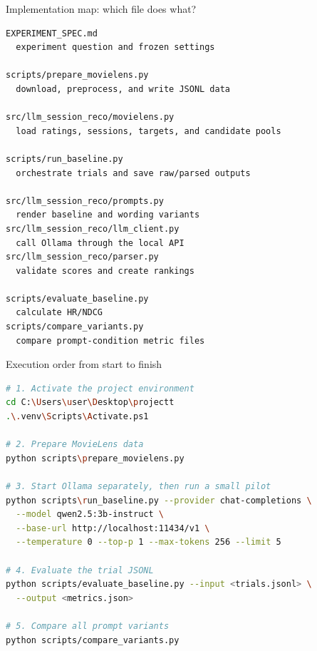 \documentclass[aspectratio=169,12pt]{beamer}
\begin{document}
\begin{frame}[fragile]{Implementation map: which file does what?}
\begin{lstlisting}
EXPERIMENT_SPEC.md
  experiment question and frozen settings

scripts/prepare_movielens.py
  download, preprocess, and write JSONL data

src/llm_session_reco/movielens.py
  load ratings, sessions, targets, and candidate pools

scripts/run_baseline.py
  orchestrate trials and save raw/parsed outputs

src/llm_session_reco/prompts.py
  render baseline and wording variants
src/llm_session_reco/llm_client.py
  call Ollama through the local API
src/llm_session_reco/parser.py
  validate scores and create rankings

scripts/evaluate_baseline.py
  calculate HR/NDCG
scripts/compare_variants.py
  compare prompt-condition metric files
\end{lstlisting}
\end{frame}

\begin{frame}[fragile]{Execution order from start to finish}
\begin{lstlisting}[language=bash]
# 1. Activate the project environment
cd C:\Users\user\Desktop\projectt
.\.venv\Scripts\Activate.ps1

# 2. Prepare MovieLens data
python scripts\prepare_movielens.py

# 3. Start Ollama separately, then run a small pilot
python scripts\run_baseline.py --provider chat-completions \
  --model qwen2.5:3b-instruct \
  --base-url http://localhost:11434/v1 \
  --temperature 0 --top-p 1 --max-tokens 256 --limit 5

# 4. Evaluate the trial JSONL
python scripts/evaluate_baseline.py --input <trials.jsonl> \
  --output <metrics.json>

# 5. Compare all prompt variants
python scripts/compare_variants.py
\end{lstlisting}
\end{frame}
\end{document}
